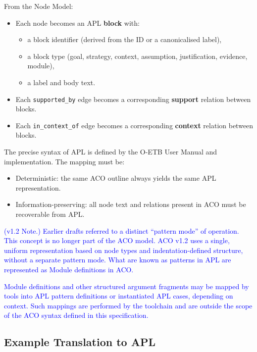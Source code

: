 \documentclass[11pt]{article}
\begin{document}
From the Node Model:
\begin{itemize}[leftmargin=2em]
  \item Each node becomes an APL \textbf{block} with:
  \begin{itemize}[leftmargin=1.5em]
    \item a block identifier (derived from the ID or a canonicalised label),
    \item a block type (goal, strategy, context, assumption, justification, evidence, module),
    \item a label and body text.
  \end{itemize}

  \item Each \texttt{supported\_by} edge becomes a corresponding \textbf{support} relation between blocks.

  \item Each \texttt{in\_context\_of} edge becomes a corresponding \textbf{context} relation between blocks.
\end{itemize}

The precise syntax of APL is defined by the O-ETB User Manual and implementation.
The mapping must be:
\begin{itemize}[leftmargin=2em]
  \item Deterministic: the same ACO outline always yields the same APL representation.
  \item Information-preserving: all node text and relations present in ACO must be recoverable from APL.
\end{itemize}

\textcolor{blue}{(v1.2 Note.)
Earlier drafts referred to a distinct ``pattern mode'' of operation. This concept is
no longer part of the ACO model. ACO v1.2 uses a single, uniform representation based
on node types and indentation-defined structure, without a separate pattern mode. What are known as patterns in APL are represented as Module definitions in ACO.}

\textcolor{blue}{Module definitions and other structured argument fragments
may be mapped by tools into APL pattern definitions or instantiated APL cases, depending
on context. Such mappings are performed by the toolchain and are outside the scope of
the ACO syntax defined in this specification.}

\subsection{Example Translation to APL}
\end{document}
